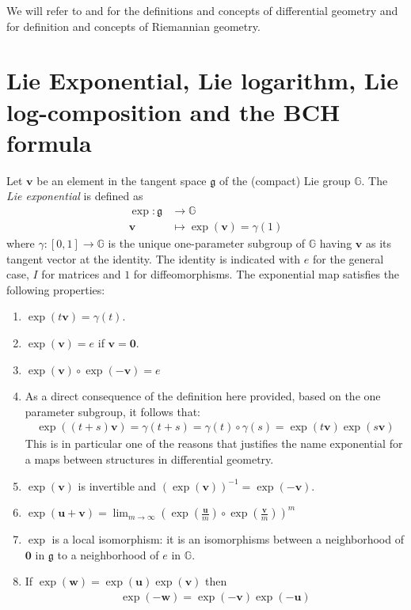 We will refer to \cite{do1976differential} and \cite{lee2012introduction} for the definitions and concepts of differential geometry and \cite{do1992riemannian} for definition and concepts of Riemannian geometry.

\section{Lie Exponential, Lie logarithm, Lie log-composition and the BCH formula}\label{se:lie_exp_log_comp_bch}
Let $\mathbf{v}$ be an element in the tangent space $\mathfrak{g}$ of the (compact) Lie group $\mathbb{G}$.
The \emph{Lie exponential} is defined as 
\begin{align*}
\exp :  \mathfrak{g} & \longrightarrow  \mathbb{G}  \\
\mathbf{v} &\longmapsto  \exp(\mathbf{v} ) = \gamma(1) %
\end{align*}
where $\gamma: [0,1]\rightarrow \mathbb{G} $ is the unique one-parameter subgroup of $\mathbb{G}$ having $\mathbf{v}$ as its tangent vector at the identity. The identity is indicated with $e$ for the general case, $I$ for matrices and $1$ for diffeomorphisms.
The exponential map satisfies the following properties:
\begin{enumerate}
	\item $\exp(t\mathbf{v}) =\gamma(t) $.
	\item $\exp(\mathbf{v}) = e$ if $\mathbf{v} = \mathbf{0}$.
	\item $\exp(\mathbf{v})\circ \exp(\mathbf{-v})  = e$
	\item As a direct consequence of the definition here provided, based on the one parameter subgroup, it follows that:
	\begin{align*}
	\exp((t+s)\mathbf{v}) = \gamma(t+s) = \gamma(t)\circ \gamma(s) = \exp(t\mathbf{v})\exp(s\mathbf{v})
	\end{align*}
	This is in particular one of the reasons that justifies the name exponential for a maps between structures in differential geometry.
	\item $\exp(\mathbf{v})$ is invertible and $(\exp(\mathbf{v}))^{-1} = \exp(-\mathbf{v})$.
		\item  $\exp(\mathbf{u} + \mathbf{v}) =\lim_{m\rightarrow \infty} (\exp(\frac{\mathbf{u}}{m}) \circ\exp(\frac{\mathbf{v}}{m}))^{m}$
	\item $\exp$ is a local isomorphism: it is an isomorphisms between a neighborhood of $\mathbf{0}$ in $\mathfrak{g}$ to a neighborhood of $e$ in $\mathbb{G}$.
	\item If $\exp(\mathbf{w}) = \exp(\mathbf{u})  \exp(\mathbf{v})$ then 
	\begin{align}\label{prop:lie_inversion_property}
	\exp(\mathbf{-w}) = \exp(\mathbf{-v}) \exp(\mathbf{-u})
	\end{align}
\end{enumerate}
